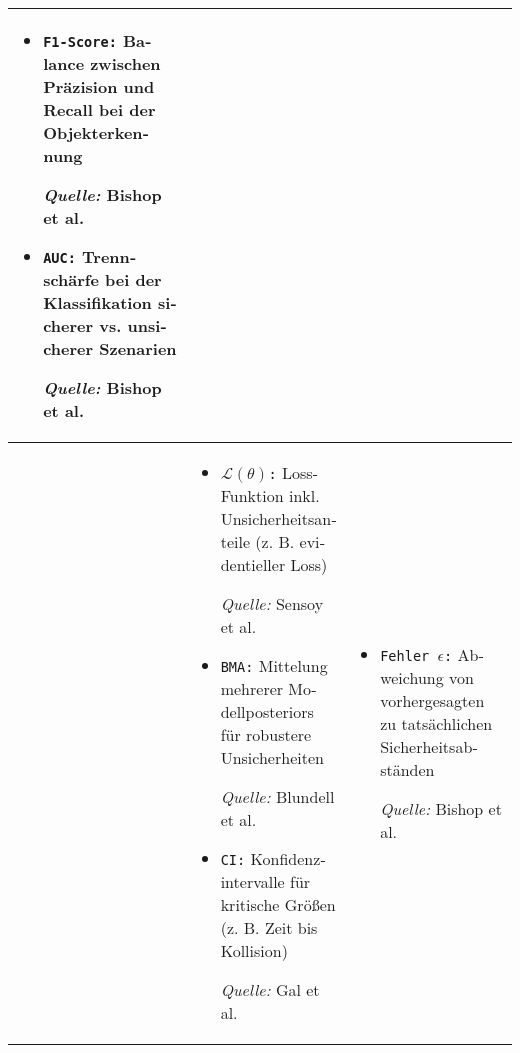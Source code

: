 \begin{otherlanguage}{ngerman}
\begin{table}[!htpb]
\begin{tabularx}{\textwidth}{|>{\centering\arraybackslash}l|X|X|}
\begin{itemize}[topsep=0em, itemsep=0.125em, leftmargin=*, label={}]
			\item \texttt{F1-Score:} Balance zwischen Präzision und Recall bei der Objekterkennung \par
			\begin{scriptsize}\textit{Quelle:} Bishop et al. \parencite[S.~40–42]{bishop2006pattern}\end{scriptsize}
			
			\item \texttt{AUC:} Trennschärfe bei der Klassifikation sicherer vs. unsicherer Szenarien \par
			\begin{scriptsize}\textit{Quelle:} Bishop et al. \parencite[S.~40–42]{bishop2006pattern}\end{scriptsize}
		\end{itemize}
		\\
		\hline
		
		\multirow{12}{*}{\textbf{\gls{Epistemische Unsicherheit}}} &
		
		\begin{itemize}[topsep=0em, itemsep=0.125em, leftmargin=*, label={}]
			\item \texttt{$\mathcal{L}(\theta)$:} Loss-Funktion inkl. Unsicherheitsanteile (z. B. evidentieller Loss) \par
			\begin{scriptsize}\textit{Quelle:} Sensoy et al. \parencite{sensoy2018evidential}\end{scriptsize}
			
			\item \texttt{BMA:} Mittelung mehrerer Modellposteriors für robustere Unsicherheiten \par
			\begin{scriptsize}\textit{Quelle:} Blundell et al. \parencite{blundell2015weight}\end{scriptsize}
			
			\item \texttt{CI:} Konfidenzintervalle für kritische Größen (z. B. Zeit bis Kollision) \par
			\begin{scriptsize}\textit{Quelle:} Gal et al. \parencite[S.~40–42]{gal2016uncertainty}\end{scriptsize}
		\end{itemize}
		&
		
		\begin{itemize}[topsep=0em, itemsep=0.125em, leftmargin=*, label={}]
			\item \texttt{Fehler $\epsilon$:} Abweichung von vorhergesagten zu tatsächlichen Sicherheitsabständen \par
			\begin{scriptsize}\textit{Quelle:} Bishop et al. \parencite[S.~233–235]{bishop2006pattern}\end{scriptsize}
			

\end{itemize}
\end{tabularx}
\end{table}
\end{otherlanguage}
